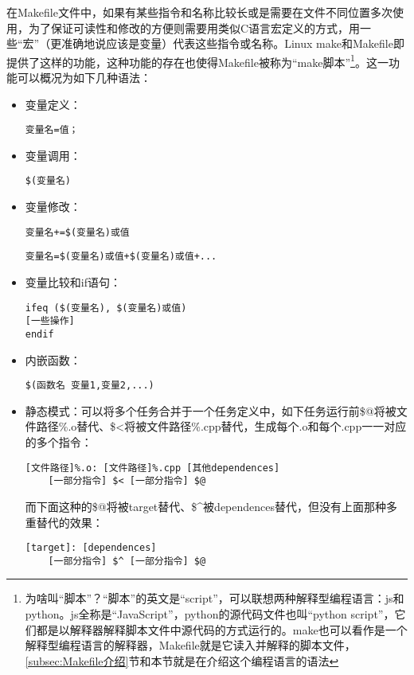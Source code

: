 在Makefile文件中，如果有某些指令和名称比较长或是需要在文件不同位置多次使用，为了保证可读性和修改的方便则需要用类似C语言宏定义的方式，用一些“宏”（更准确地说应该是变量）代表这些指令或名称。Linux make和Makefile即提供了这样的功能，这种功能的存在也使得Makefile被称为“make脚本”\footnote{为啥叫“脚本”？“脚本”的英文是“script”，可以联想两种解释型编程语言：js和python。js全称是“JavaScript”，python的源代码文件也叫“python script”，它们都是以解释器解释脚本文件中源代码的方式运行的。make也可以看作是一个解释型编程语言的解释器，Makefile就是它读入并解释的脚本文件，\ref{subsec:Makefile介绍}节和本节就是在介绍这个编程语言的语法}。这一功能可以概况为如下几种语法：
\begin{itemize}
	\item 变量定义：
	      \begin{lstlisting}
变量名=值；
    \end{lstlisting}
	\item 变量调用：
	      \begin{lstlisting}
$(变量名)
    \end{lstlisting}
	\item 变量修改：
	      \begin{lstlisting}
变量名+=$(变量名)或值
    \end{lstlisting}
	      \begin{lstlisting}
变量名=$(变量名)或值+$(变量名)或值+...
    \end{lstlisting}
	\item 变量比较和if语句：
	      \begin{lstlisting}
ifeq ($(变量名), $(变量名)或值)
[一些操作]
endif
    \end{lstlisting}
	\item 内嵌函数：
	      \begin{lstlisting}
$(函数名 变量1,变量2,...)
    \end{lstlisting}
	\item 静态模式：可以将多个任务合并于一个任务定义中，如下任务运行前{\codefont\$@}将被{\codefont 文件路径\%.o}替代、{\codefont\$<}将被{\codefont 文件路径\%.cpp}替代，生成每个.o和每个.cpp一一对应的多个指令：
	      \begin{lstlisting}
[文件路径]%.o: [文件路径]%.cpp [其他dependences]
    [一部分指令] $< [一部分指令] $@
    \end{lstlisting}
	      而下面这种的{\codefont\$@}将被{\codefont target}替代、{\codefont\$\^{}}被{\codefont dependences}替代，但没有上面那种多重替代的效果：
	      \begin{lstlisting}
[target]: [dependences]
    [一部分指令] $^ [一部分指令] $@
    \end{lstlisting}
\end{itemize}

